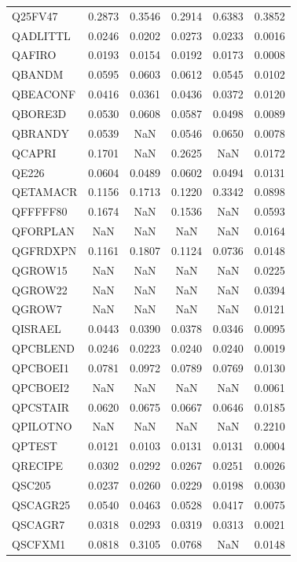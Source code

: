 \begin{longtable}{lccccc}
Q25FV47 & 0.2873 & 0.3546 & 0.2914 & 0.6383 & 0.3852 \\
QADLITTL & 0.0246 & 0.0202 & 0.0273 & 0.0233 & 0.0016 \\
QAFIRO & 0.0193 & 0.0154 & 0.0192 & 0.0173 & 0.0008 \\
QBANDM & 0.0595 & 0.0603 & 0.0612 & 0.0545 & 0.0102 \\
QBEACONF & 0.0416 & 0.0361 & 0.0436 & 0.0372 & 0.0120 \\
QBORE3D & 0.0530 & 0.0608 & 0.0587 & 0.0498 & 0.0089 \\
QBRANDY & 0.0539 & NaN & 0.0546 & 0.0650 & 0.0078 \\
QCAPRI & 0.1701 & NaN & 0.2625 & NaN & 0.0172 \\
QE226 & 0.0604 & 0.0489 & 0.0602 & 0.0494 & 0.0131 \\
QETAMACR & 0.1156 & 0.1713 & 0.1220 & 0.3342 & 0.0898 \\
QFFFFF80 & 0.1674 & NaN & 0.1536 & NaN & 0.0593 \\
QFORPLAN & NaN & NaN & NaN & NaN & 0.0164 \\
QGFRDXPN & 0.1161 & 0.1807 & 0.1124 & 0.0736 & 0.0148 \\
QGROW15 & NaN & NaN & NaN & NaN & 0.0225 \\
QGROW22 & NaN & NaN & NaN & NaN & 0.0394 \\
QGROW7 & NaN & NaN & NaN & NaN & 0.0121 \\
QISRAEL & 0.0443 & 0.0390 & 0.0378 & 0.0346 & 0.0095 \\
QPCBLEND & 0.0246 & 0.0223 & 0.0240 & 0.0240 & 0.0019 \\
QPCBOEI1 & 0.0781 & 0.0972 & 0.0789 & 0.0769 & 0.0130 \\
QPCBOEI2 & NaN & NaN & NaN & NaN & 0.0061 \\
QPCSTAIR & 0.0620 & 0.0675 & 0.0667 & 0.0646 & 0.0185 \\
QPILOTNO & NaN & NaN & NaN & NaN & 0.2210 \\
QPTEST & 0.0121 & 0.0103 & 0.0131 & 0.0131 & 0.0004 \\
QRECIPE & 0.0302 & 0.0292 & 0.0267 & 0.0251 & 0.0026 \\
QSC205 & 0.0237 & 0.0260 & 0.0229 & 0.0198 & 0.0030 \\
QSCAGR25 & 0.0540 & 0.0463 & 0.0528 & 0.0417 & 0.0075 \\
QSCAGR7 & 0.0318 & 0.0293 & 0.0319 & 0.0313 & 0.0021 \\
QSCFXM1 & 0.0818 & 0.3105 & 0.0768 & NaN & 0.0148 \\

\end{longtable}
